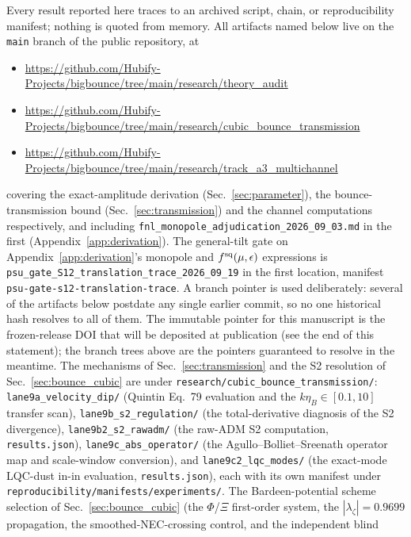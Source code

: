 \documentclass[aps,prd,twocolumn,superscriptaddress,nofootinbib,longbibliography]{revtex4-2}
\begin{document}
Every result reported here traces to an archived script, chain, or reproducibility
manifest; nothing is quoted from memory. All artifacts named below live on the
\texttt{main} branch of the public repository, at\footnotesize
\begin{itemize}
\item[] \url{https://github.com/Hubify-Projects/bigbounce/tree/main/research/theory_audit}
\item[] \url{https://github.com/Hubify-Projects/bigbounce/tree/main/research/cubic_bounce_transmission}
\item[] \url{https://github.com/Hubify-Projects/bigbounce/tree/main/research/track_a3_multichannel}
\end{itemize}
\normalsize
covering the exact-amplitude derivation (Sec.~\ref{sec:parameter}), the
bounce-transmission bound (Sec.~\ref{sec:transmission}) and the channel
computations respectively, and
including \texttt{fnl\_monopole\_adjudication\_}\allowbreak\texttt{2026\_09\_03.md}
in the first (Appendix~\ref{app:derivation}). The general-tilt gate on
Appendix~\ref{app:derivation}'s monopole and $f^{\rm sq}(\mu,\epsilon)$
expressions is
\texttt{psu\_gate\_S12\_translation\_trace\_}\allowbreak\texttt{2026\_09\_19}
in the first location, manifest
\texttt{psu-gate-s12-translation-trace}. A branch pointer is used
deliberately: several of the artifacts below postdate any single earlier
commit, so no one historical hash resolves to all of them. The immutable
pointer for this manuscript is the frozen-release DOI that will be
deposited at publication (see the end of this statement); the branch trees
above are the pointers guaranteed to resolve in the meantime. The
mechanisms of Sec.~\ref{sec:transmission} and the S2 resolution of
Sec.~\ref{sec:bounce_cubic} are under
\texttt{research/cubic\_bounce\_transmission/}: \texttt{lane9a\_velocity\_dip/}
(Quintin Eq.~79 evaluation and the $k\eta_B\in[0.1,10]$ transfer scan),
\texttt{lane9b\_s2\_regulation/} (the total-derivative diagnosis of the S2
divergence), \texttt{lane9b2\_s2\_rawadm/} (the raw-ADM S2 computation,
\texttt{results.json}), \texttt{lane9c\_abs\_operator/} (the
Agullo--Bolliet--Sreenath operator map and scale-window conversion), and
\texttt{lane9c2\_lqc\_modes/} (the exact-mode LQC-dust in-in evaluation,
\texttt{results.json}), each with its own manifest under
\texttt{reproducibility/manifests/experiments/}. The Bardeen-potential
scheme selection of Sec.~\ref{sec:bounce_cubic}
(the $\Phi$/$\Xi$ first-order system, the $|\lambda_\zeta|=0.9699$
propagation, the smoothed-NEC-crossing control, and the independent blind
\end{document}
